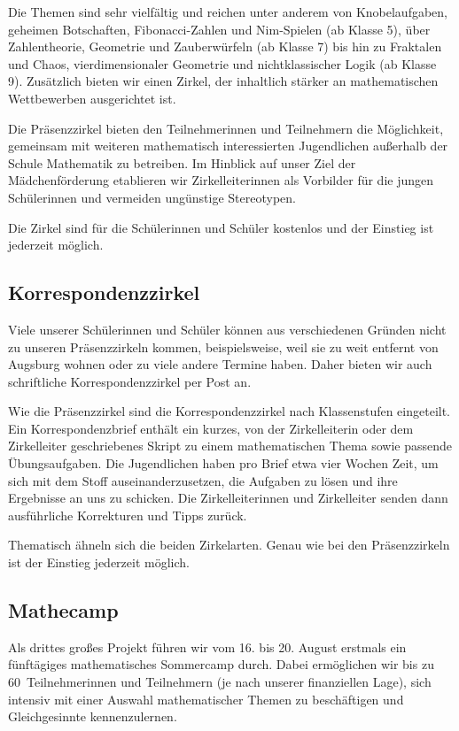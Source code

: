 \documentclass[12pt]{zettel}
\begin{document}
Die Themen sind sehr vielfältig und reichen unter anderem von
Knobelaufgaben, geheimen Botschaften, Fibonacci-Zahlen und Nim-Spielen (ab Klasse 5),
über Zahlentheorie, Geometrie und Zauberwürfeln (ab Klasse 7) bis hin zu
Fraktalen und Chaos, vierdimensionaler Geometrie und nichtklassischer Logik
(ab Klasse 9). Zusätzlich bieten wir einen Zirkel, der inhaltlich stärker an
mathematischen Wettbewerben ausgerichtet ist.

Die Präsenzzirkel bieten den Teilnehmerinnen und Teilnehmern die Möglichkeit,
gemeinsam mit weiteren mathematisch interessierten Jugendlichen außerhalb der
Schule Mathematik zu betreiben. Im Hinblick auf unser Ziel der Mädchenförderung etablieren wir Zirkelleiterinnen als Vorbilder für die jungen Schülerinnen und vermeiden ungünstige Stereotypen.

Die Zirkel sind für die Schülerinnen und Schüler kostenlos und der Einstieg ist jederzeit möglich.

\subsection{Korrespondenzzirkel}

Viele unserer Schülerinnen und Schüler können aus verschiedenen Gründen
nicht zu unseren Präsenzzirkeln kommen, beispielsweise, weil sie zu weit
entfernt von Augsburg wohnen oder zu viele andere Termine haben.
Daher bieten wir auch schriftliche Korrespondenzzirkel per Post
an.

Wie die Präsenzzirkel sind die Korrespondenzzirkel nach Klassenstufen eingeteilt. Ein
Korrespondenzbrief enthält ein kurzes, von der Zirkelleiterin oder dem
Zirkelleiter geschriebenes Skript zu einem mathematischen Thema sowie passende
Übungsaufgaben. Die Jugendlichen haben pro Brief etwa vier Wochen Zeit, um sich
mit dem Stoff auseinanderzusetzen, die Aufgaben zu lösen und ihre Ergebnisse
an uns zu schicken. Die Zirkelleiterinnen und Zirkelleiter senden dann
ausführliche Korrekturen und Tipps zurück.

Thematisch ähneln sich die beiden Zirkelarten. Genau wie bei den
Präsenzzirkeln ist der Einstieg jederzeit möglich.


\subsection{Mathecamp}

Als drittes großes Projekt führen wir vom 16. bis 20. August erstmals ein fünftägiges
mathematisches Sommercamp durch. Dabei ermöglichen wir bis zu 60~Teilnehmerinnen
und Teilnehmern (je nach unserer finanziellen Lage), sich intensiv mit einer Auswahl mathematischer Themen zu
beschäftigen und Gleichgesinnte kennenzulernen.
\end{document}
